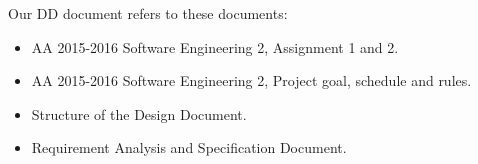 Our DD document refers to these documents:
\begin{itemize}
   \item AA 2015-2016 Software Engineering 2, Assignment 1 and 2.
   \item AA 2015-2016 Software Engineering 2, Project goal, schedule and rules.
   \item Structure of the Design Document.
   \item Requirement Analysis and Specification Document.
\end{itemize}
